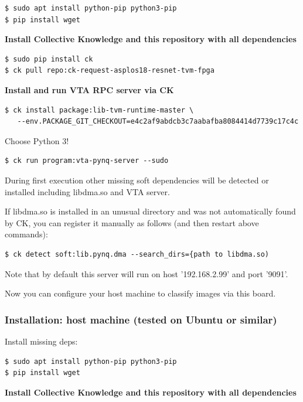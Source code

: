 \documentclass[sigconf]{acmart}
\begin{document}
\begin{verbatim}
$ sudo apt install python-pip python3-pip
$ pip install wget
\end{verbatim}

\textbf{Install Collective Knowledge and this repository with all dependencies}

\begin{verbatim}
$ sudo pip install ck
$ ck pull repo:ck-request-asplos18-resnet-tvm-fpga
\end{verbatim}

\textbf{Install and run VTA RPC server via CK}

\begin{verbatim}
$ ck install package:lib-tvm-runtime-master \
   --env.PACKAGE_GIT_CHECKOUT=e4c2af9abdcb3c7aabafba8084414d7739c17c4c
\end{verbatim}

Choose Python 3!

\begin{verbatim}
$ ck run program:vta-pynq-server --sudo
\end{verbatim}

During first execution other missing soft dependencies 
will be detected or installed including libdma.so and VTA server.

If libdma.so is installed in an unusual directory and was not automatically found by CK, 
you can register it manually as follows (and then restart above commands):

\begin{verbatim}
$ ck detect soft:lib.pynq.dma --search_dirs={path to libdma.so)
\end{verbatim}

Note that by default this server will run on host '192.168.2.99' and port '9091'.

Now you can configure your host machine to classify images via this board.

\subsubsection{Installation: host machine (tested on Ubuntu or similar)}

Install missing deps:

\begin{verbatim}
$ sudo apt install python-pip python3-pip
$ pip install wget
\end{verbatim}

\textbf{Install Collective Knowledge and this repository with all dependencies}
\end{document}
